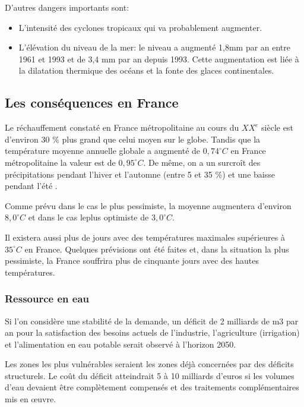 \documentclass[a4paper,10pt]{article}
\begin{document}
D'autres dangers importants sont:
\begin{itemize}
\item L'intensité des cyclones tropicaux qui va probablement augmenter.
\item L’élévation  du niveau de la  mer: le niveau  a augmenté 1,8mm par  an entre
  1961 et 1993 et de 3,4 mm par an depuis 1993. Cette augmentation est {\color{red}liée à}  la dilatation thermique des océans et la fonte des glaces continentales.
\end{itemize}

\subsection{Les conséquences en France}

Le réchauffement constaté en France métropolitaine au cours du $XX^e$ siècle 
est {\color{red}d'environ} 30  \% plus grand que celui moyen sur le globe. Tandis
que  la température  moyenne annuelle  global{\color{red}e} a  augmenté de  $0,74^{\circ}C$ en
France métropolitaine la valeur est de $0,95^{\circ}C$.%
De même, on a un surcroît des précipitations pendant l'hiver et l'automne (entre 5 et 35 \%) et une baisse pendant l'été\cite{DOCFRANCE} . 

Comme prévu dans  le cas {\color{red}le} plus pessimiste,  la moyenne augmentera
{\color{red}d'}environ $8,0^{\circ}C$ et dans le cas leplus optimiste de $3,0^{\circ}C$.

Il  existera aussi plus  de jours  avec {\color{red}des}  températures maximales
supérieures à $35^{\circ}C$ en  France. Quelque{\color{red}s} prévisions ont été
faites et, dans la situation la plus pessimiste, la France souffrira plus de cinquante jours avec des hautes températures. 


\subsubsection*{Ressource en eau}
Si l’on considère une stabilité de la demande, un déficit de 2 milliards de m3 par an  pour la satisfaction  des besoins actuels de  l’industrie, l’agriculture (irrigation) et l’alimentation en eau potable serait observé à l’horizon 2050.

Les zones les plus vulnérables seraient les zones déjà concernées par des déficits structurels. Le coût du déficit atteindrait 5 à 10 milliards d’euros si les volumes d’eau devaient être
complètement compensés et des traitements complémentaires mis en œuvre.
\end{document}
